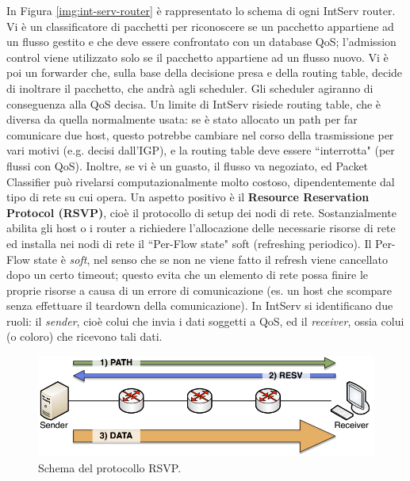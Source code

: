 In Figura \ref{img:int-serv-router} è rappresentato lo schema di ogni IntServ router. Vi è un classificatore di pacchetti per riconoscere se un pacchetto appartiene ad un flusso gestito e che deve essere confrontato con un database QoS; l'admission control viene utilizzato solo se il pacchetto appartiene ad un flusso nuovo. Vi è poi un forwarder che, sulla base della decisione presa e della routing table, decide di inoltrare il pacchetto, che andrà agli scheduler. Gli scheduler agiranno di conseguenza alla QoS decisa. Un limite di IntServ risiede routing table, che è diversa da quella normalmente usata: se è stato allocato un path per far comunicare due host, questo potrebbe cambiare nel corso della trasmissione per vari motivi (e.g. decisi dall'IGP), e la routing table deve essere \textquotedblleft interrotta" (per flussi con QoS). Inoltre, se vi è un guasto, il flusso va negoziato, ed Packet Classifier può rivelarsi computazionalmente molto costoso, dipendentemente dal tipo di rete su cui opera. Un aspetto positivo è il \textbf{Resource Reservation Protocol (RSVP)}, cioè il protocollo di setup dei nodi di rete. Sostanzialmente abilita gli host o i router a richiedere l'allocazione delle necessarie risorse di rete ed installa nei nodi di rete il \textquotedblleft Per-Flow state" soft (refreshing periodico). Il Per-Flow state è \textit{soft}, nel senso che se non ne viene fatto il refresh viene cancellato dopo un certo timeout; questo evita che un elemento di rete possa finire le proprie risorse a causa di un errore di comunicazione (es. un host che scompare senza effettuare il teardown della comunicazione). In IntServ si identificano due ruoli: il \textit{sender}, cioè colui che invia i dati soggetti a QoS, ed il \textit{receiver}, ossia colui (o coloro) che ricevono tali dati.
\begin{figure}[htbp]
	\centering
	\includegraphics[scale = 0.4]{images/RSVP}
	\caption{Schema del protocollo RSVP.}
	\label{img:RSVP}
\end{figure}\\

